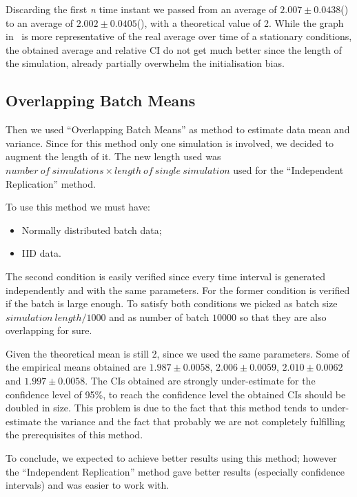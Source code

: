 \documentclass[10pt,a4paper]{article}
\begin{document}
Discarding the first \emph{n} time instant we passed from an average of \(2.007 \pm 0.0438\)() to an average of \(2.002 \pm 0.0405\)(), with a theoretical value of 2. While the graph in~ is more representative of the real average over time of a stationary conditions, the obtained average and relative CI do not get much better since the length of the simulation, already partially overwhelm the initialisation bias.

\subsection*{Overlapping Batch Means}

Then we used ``Overlapping Batch Means'' as method to estimate data mean and variance. Since for this method only one simulation is involved, we decided to augment the length of it. The new length used was \(\mathit{number~of~simulations}\times\mathit{length~of~single~simulation}\) used for the ``Independent Replication'' method.

To use this method we must have:
\begin{itemize}
\item Normally distributed batch data;
\item IID data.
\end{itemize}

The second condition is easily verified since every time interval is generated independently and with the same parameters. For the former condition is verified if the batch is large enough. To satisfy both conditions we picked as batch size \(\mathit{simulation~length} / 1000\) and as number of batch \(10000\) so that they are also overlapping for sure.

Given the theoretical mean is still 2, since we used the same parameters. Some of the empirical means obtained are \( 1.987 \pm 0.0058\), \(2.006 \pm 0.0059\), \(2.010 \pm 0.0062\) and \(1.997 \pm 0.0058\). The CIs obtained are strongly under-estimate for the confidence level of 95\%, to reach the confidence level the obtained CIs should be doubled in size. This problem is due to the fact that this method tends to under-estimate the variance and the fact that probably we are not completely fulfilling the prerequisites of this method.

To conclude, we expected to achieve better results using this method; however the ``Independent Replication'' method gave better results (especially confidence intervals) and was easier to work with.
\end{document}
